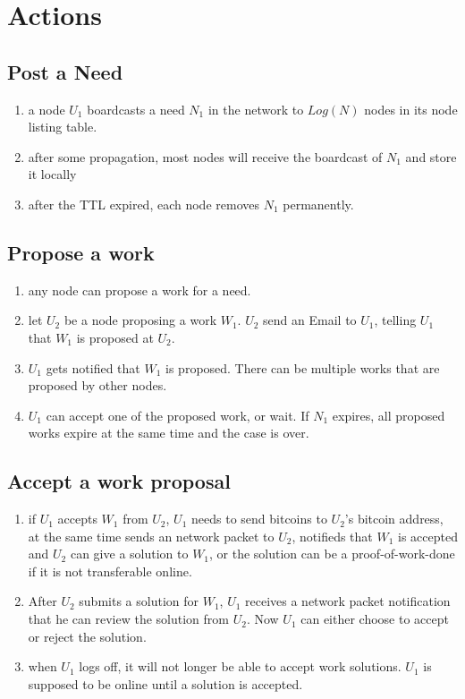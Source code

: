 \documentclass[12pt]{article}
\begin{document}
\section{Actions}

\subsection{Post a Need}
\begin{enumerate}
	\item a node $U_1$ boardcasts a need $N_1$ in the network to $Log(N)$ nodes in its node listing table. 
	\item after some propagation, most nodes will receive the boardcast of $N_1$ and store it locally
	\item after the TTL expired, each node removes $N_1$ permanently.
\end{enumerate}

\subsection{Propose a work}
\begin{enumerate}
	\item any node can propose a work for a need.
	\item let $U_2$ be a node proposing a work $W_1$. $U_2$ send an Email to $U_1$, telling $U_1$ that $W_1$ is proposed at $U_2$.
	\item $U_1$ gets notified that $W_1$ is proposed. There can be multiple works that are proposed by other nodes. 
	\item $U_1$ can accept one of the proposed work, or wait. If $N_1$ expires, all proposed works expire at the same time and the case is over.
\end{enumerate}

\subsection{Accept a work proposal}
\begin{enumerate}
	\item if $U_1$ accepts $W_1$ from $U_2$, $U_1$ needs to send bitcoins to $U_2$'s bitcoin address, at the same time sends an network packet to $U_2$, notifieds that $W_1$ is accepted and $U_2$ can give a solution to $W_1$, or the solution can be a proof-of-work-done if it is not transferable online.
	\item After $U_2$ submits a solution for $W_1$, $U_1$ receives a network packet notification that he can review the solution from $U_2$. Now $U_1$ can either choose to accept or reject the solution.
	\item when $U_1$ logs off, it will not longer be able to accept work solutions. $U_1$ is supposed to be online until a solution is accepted.  
\end{enumerate}
\end{document}
